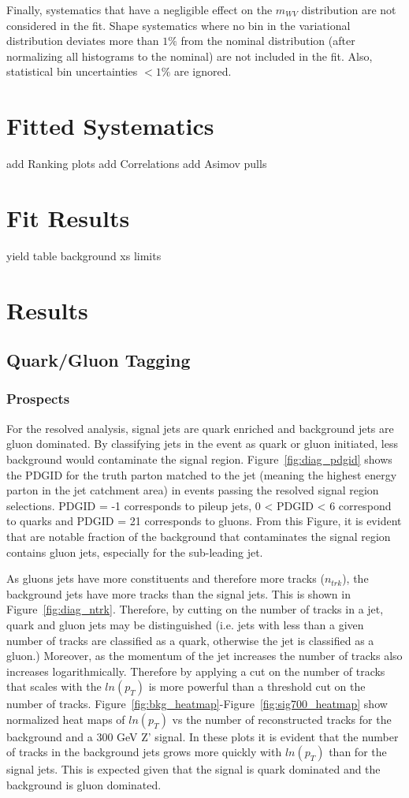 Finally, systematics that have a negligible effect on the $m_{WV}$ distribution are not considered in the fit. Shape systematics where no bin in the variational distribution deviates more than $1\%$ from the nominal distribution (after normalizing all histograms to the nominal) are not included in the fit. Also, statistical bin uncertainties $< 1\%$ are ignored. 

\section{Fitted Systematics}
add Ranking plots 
add Correlations
add Asimov pulls

\section{Fit Results}
yield table
background xs
limits
\section{Results}

\subsection{Quark/Gluon Tagging}
\subsubsection{Prospects}
For the resolved analysis, signal jets are quark enriched and background jets are gluon dominated. By classifying jets in the event as quark or gluon initiated, less background would contaminate the signal region. Figure~\ref{fig:diag_pdgid} shows the PDGID for the truth parton matched to the jet (meaning the highest energy parton in the jet catchment area) in events passing the resolved signal region selections. PDGID = -1 corresponds to pileup jets, 0 < PDGID < 6 correspond to quarks and PDGID = 21 corresponds to gluons. From this Figure, it is evident that are notable fraction of the background that contaminates the signal region contains gluon jets, especially for the sub-leading jet. 

As gluons jets have more constituents and therefore more tracks ($n_{trk}$), the background jets have more tracks than the signal jets. This is shown in Figure~\ref{fig:diag_ntrk}. Therefore, by cutting on the number of tracks in a jet, quark and gluon jets may be distinguished (i.e. jets with less than a given number of tracks are classified as a quark, otherwise the jet is classified as a gluon.) Moreover, as the momentum of the jet increases the number of tracks also increases logarithmically. Therefore by applying a cut on the number of tracks that scales with the $ln(p_{T})$ is more powerful than a threshold cut on the number of tracks. Figure~\ref{fig:bkg_heatmap}-Figure~\ref{fig:sig700_heatmap} show normalized heat maps of $ln(p_{T})$ vs the number of reconstructed tracks for the background and a 300 GeV Z' signal. In these plots it is evident that the number of tracks in the background jets grows more quickly with $ln(p_{T})$ than for the signal jets. This is expected given that the signal is quark dominated and the background is gluon dominated. 


